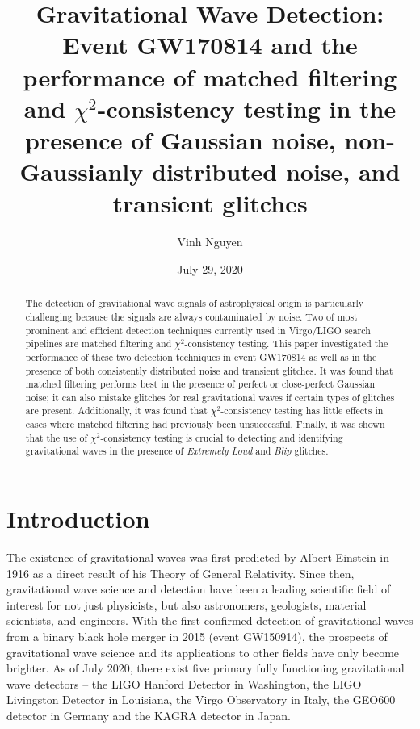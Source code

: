 \documentclass[preprint,
letterpaper,
 amsmath,amssymb,
 aps,
]{revtex4-2}
\begin{document}
\title{Gravitational Wave Detection:\\
Event GW170814 and the performance of matched filtering and $\chi^2$-consistency testing in the presence of Gaussian noise, non-Gaussianly distributed noise, and transient glitches}
\author{Vinh Nguyen}
\date{July 29, 2020}
\begin{abstract}
The detection of gravitational wave signals of astrophysical origin is particularly challenging because the signals are always contaminated by noise. Two of most prominent and efficient detection techniques currently used in Virgo/LIGO search pipelines are matched filtering and $\chi^2$-consistency testing. This paper investigated the performance of these two detection techniques in event GW170814 as well as in the presence of both consistently distributed noise and transient glitches. It was found that matched filtering performs best in the presence of perfect or close-perfect Gaussian noise; it can also mistake glitches for real gravitational waves if certain types of glitches are present. Additionally, it was found that $\chi^2$-consistency testing has little effects in cases where matched filtering had previously been unsuccessful. Finally, it was shown that the use of $\chi^2$-consistency testing is crucial to detecting and identifying gravitational waves in the presence of \textit{Extremely Loud} and \textit{Blip} glitches.
\end{abstract}

\maketitle
\section{Introduction}
The existence of gravitational waves was first predicted by Albert Einstein in 1916 as a direct result of his Theory of General Relativity. Since then, gravitational wave science and detection have been a leading scientific field of interest for not just physicists, but also astronomers, geologists, material scientists, and engineers. With the first confirmed detection of gravitational waves from a binary black hole merger in 2015 (event GW150914), the prospects of gravitational wave science and its applications to other fields have only become brighter. As of July 2020, there exist five primary fully functioning gravitational wave detectors – the LIGO Hanford Detector in Washington, the LIGO Livingston Detector in Louisiana, the Virgo Observatory in Italy, the GEO600 detector in Germany and the KAGRA detector in Japan. 
\end{document}
